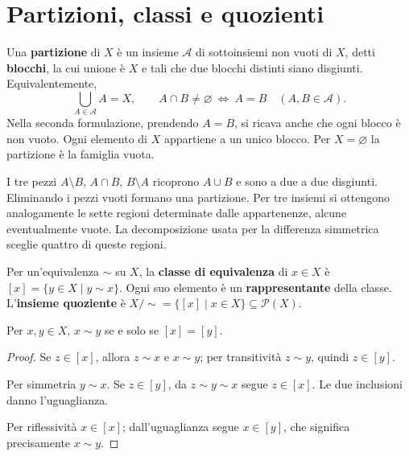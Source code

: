 \section{Partizioni, classi e quozienti}
\begin{definizione}
Una \textbf{partizione} di $X$ è un insieme $\mathcal A$ di sottoinsiemi non vuoti di $X$, detti \textbf{blocchi}, la cui unione è $X$ e tali che due blocchi distinti siano disgiunti. Equivalentemente,
\[
\bigcup_{A\in\mathcal A}A=X,\qquad
A\cap B\ne\varnothing\ \Longleftrightarrow\ A=B
\quad(A,B\in\mathcal A).
\]
Nella seconda formulazione, prendendo $A=B$, si ricava anche che ogni blocco è non vuoto. Ogni elemento di $X$ appartiene a un unico blocco. Per $X=\varnothing$ la partizione è la famiglia vuota.
\end{definizione}

\begin{esempio}
I tre pezzi $A\setminus B$, $A\cap B$, $B\setminus A$ ricoprono $A\cup B$ e sono a due a due disgiunti. Eliminando i pezzi vuoti formano una partizione. Per tre insiemi si ottengono analogamente le sette regioni determinate dalle appartenenze, alcune eventualmente vuote. La decomposizione usata per la differenza simmetrica sceglie quattro di queste regioni.
\end{esempio}

\begin{definizione}
Per un'equivalenza $\sim$ su $X$, la \textbf{classe di equivalenza} di $x\in X$ è $[x]=\{y\in X\mid y\sim x\}$. Ogni suo elemento è un \textbf{rappresentante} della classe. L'\textbf{insieme quoziente} è $X/{\sim}=\{[x]\mid x\in X\}\subseteq\mathcal P(X)$.
\end{definizione}

\begin{proposizione}\label{prop:classi}
Per $x,y\in X$, $x\sim y$ se e solo se $[x]=[y]$.
\end{proposizione}
\begin{proof}
 Se $z\in[x]$, allora $z\sim x$ e $x\sim y$; per transitività $z\sim y$, quindi $z\in[y]$.

 Per simmetria $y\sim x$. Se $z\in[y]$, da $z\sim y\sim x$ segue $z\in[x]$. Le due inclusioni danno l'uguaglianza.

 Per riflessività $x\in[x]$; dall'uguaglianza segue $x\in[y]$, che significa precisamente $x\sim y$.
\end{proof}


